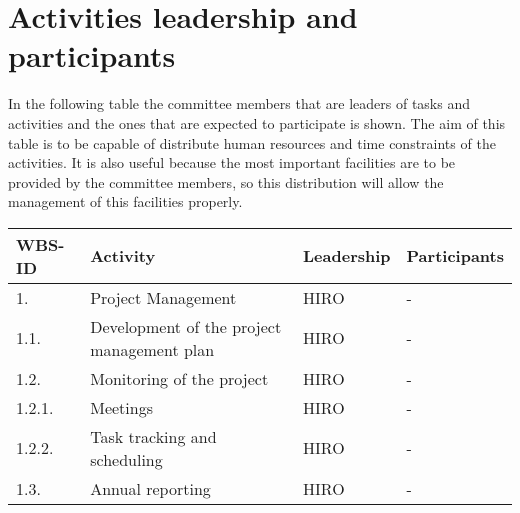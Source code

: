 \section{Activities leadership and participants}
In the following table the committee members that are leaders of tasks and activities and the ones that are expected to participate is shown. The aim of this table is to be capable of distribute human resources and time constraints of the activities. It is also useful because the most important facilities are to be provided by the committee members, so this distribution will allow the management of this facilities properly. 

\begin{longtable}[H]{p{1.5cm} >{\raggedright\arraybackslash}p{4cm} >{\raggedright\arraybackslash}p{3.8cm} >{\raggedright\arraybackslash}p{4cm}}
	
	\toprule[2pt]
	
	\textbf{WBS-ID} &  \textbf{Activity}  & \textbf{Leadership} & \textbf{Participants} \\ 
	
	\midrule [1.5pt]
	\endhead
	
	1. & Project Management &HIRO& -\vspace{0.2cm} \\
	
	\midrule
	
	1.1. & Development of the project management plan & HIRO& -\vspace{0.2cm} \\
	
	\midrule
	
	1.2. & Monitoring of the project & HIRO & -\vspace{0.2cm} \\
	
	\midrule
	
	1.2.1. & Meetings & HIRO & -\vspace{0.2cm} \\
	
	\midrule
	
	1.2.2. & Task tracking and scheduling & HIRO & -\vspace{0.2cm} \\
	
	\midrule
	
	1.3. & Annual reporting & HIRO & -\vspace{0.2cm} \\
	
	\midrule
	

\end{longtable}
